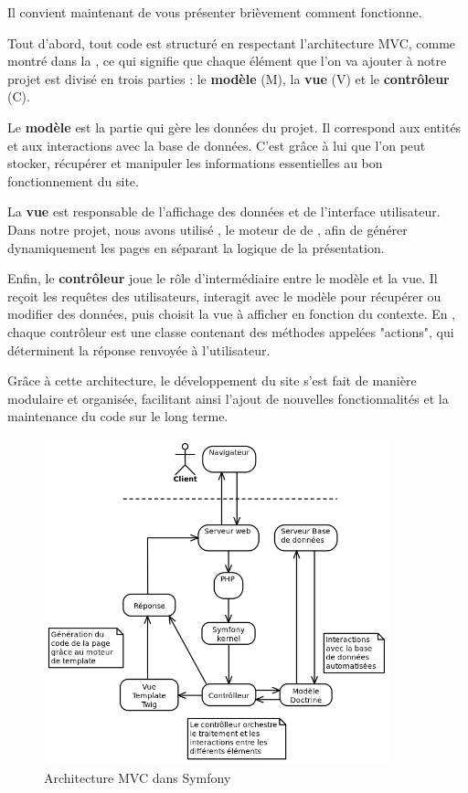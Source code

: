 Il convient maintenant de vous présenter brièvement comment  fonctionne.

Tout d'abord, tout code  est structuré en respectant l'architecture MVC, comme montré dans la , ce qui signifie que chaque élément que l'on va ajouter à notre projet est divisé en trois parties : le \textbf{modèle} (M), la \textbf{vue} (V) et le \textbf{contrôleur} (C). 

Le \textbf{modèle} est la partie qui gère les données du projet. Il correspond aux entités et aux interactions avec la base de données. C’est grâce à lui que l’on peut stocker, récupérer et manipuler les informations essentielles au bon fonctionnement du site.

La \textbf{vue} est responsable de l'affichage des données et de l'interface utilisateur. Dans notre projet, nous avons utilisé , le moteur de  de , afin de générer dynamiquement les pages  en séparant la logique de la présentation.

Enfin, le \textbf{contrôleur} joue le rôle d’intermédiaire entre le modèle et la vue. Il reçoit les requêtes des utilisateurs, interagit avec le modèle pour récupérer ou modifier des données, puis choisit la vue à afficher en fonction du contexte. En , chaque contrôleur est une classe  contenant des méthodes appelées "actions", qui déterminent la réponse renvoyée à l’utilisateur.

Grâce à cette architecture, le développement du site s’est fait de manière modulaire et organisée, facilitant ainsi l’ajout de nouvelles fonctionnalités et la maintenance du code sur le long terme.
\bigskip

\begin{figure}[H]
    \centering
    \includegraphics[width=10cm]{assets/pictures/mvc.png}
    \caption{Architecture MVC dans Symfony}
    \label{mvc}
\end{figure}
\bigskip

